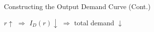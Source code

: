 \documentclass[11pt,aspectratio=169,usenames,dvipsnames]{beamer}
\begin{document}
\begin{frame}{Constructing the Output Demand Curve (Cont.)}
\label{slide:Constructing_the_Output_Demand_Curve__Cont__}
    \begin{center}
        $ r \uparrow  $ $ \Rightarrow  $ $ I_{D}( r ) \downarrow  $ $ \Rightarrow  $ total demand $ \downarrow  $
    \end{center}

    \begin{columns}
        \begin{column}{0.5\textwidth}
            \begin{figure}
            \end{figure}
        \end{column}
        \begin{column}{0.5\textwidth}
            \begin{figure}
                \scalebox{0.9}{
}
\end{figure}
\end{column}
\end{columns}
\end{frame}
\end{document}
